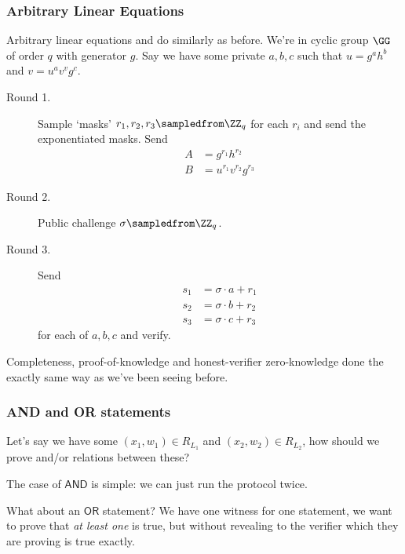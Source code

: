 \subsubsection{Arbitrary Linear Equations}
\begin{example}
    Arbitrary linear equations and do similarly as before. We're in cyclic group $\GG$ of order $q$ with generator $g$. Say we have some private $a, b, c$ such that $u = g^{a}h^{b}$ and $v = u^av^vg^c$.
    \begin{description}
        \item[Round 1.] Sample `masks' $r_1, r_2, r_3\sampledfrom\ZZ_q$ for each $r_i$ and send the exponentiated masks. Send
            \begin{align*}
                A & = g^{r_1}h^{r_2}        \\
                B & = u^{r_1}v^{r_2}g^{r_3}
            \end{align*}
        \item[Round 2.] Public challenge $\sigma\sampledfrom\ZZ_q$.
        \item[Round 3.] Send
            \begin{align*}
                s_1 & = \sigma\cdot a + r_1 \\
                s_2 & = \sigma\cdot b + r_2 \\
                s_3 & = \sigma\cdot c + r_3
            \end{align*} for each of $a, b, c$ and verify.
    \end{description}

    Completeness, proof-of-knowledge and honest-verifier zero-knowledge done the exactly same way as we've been seeing before.
\end{example}

\subsubsection{\textsf{AND} and \textsf{OR} statements}\label{sec:mar7-sigma-or}
Let's say we have some $(x_1, w_1)\in R_{L_1}$ and $(x_2, w_2)\in R_{L_2}$, how should we prove and/or relations between these?

The case of $\mathsf{AND}$ is simple: we can just run the protocol twice.

What about an $\mathsf{OR}$ statement? We have one witness for one statement, we want to prove that \emph{at least one} is true, but without revealing to the verifier which they are proving is true exactly.


